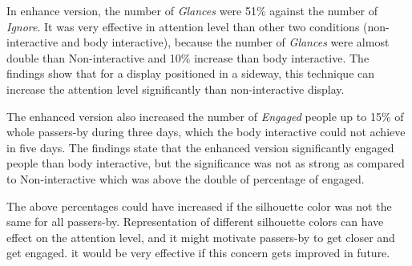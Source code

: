 In enhance version, the number of \emph{Glances} were 51\% against the number of \emph{Ignore}. It was very effective in attention level than other two conditions (non-interactive and body interactive), because the number of \emph{Glances} were almost double than Non-interactive and 10\% increase than body interactive. The findings show that for a display positioned in a sideway, this technique can increase the attention level significantly than non-interactive display.

The enhanced version also increased the number of \emph{Engaged} people up to 15\% of whole passers-by during three days, which the body interactive could not achieve in five days. The findings state that the enhanced version significantly engaged people than body interactive, but the significance was not as strong as compared to Non-interactive which was above the double of percentage of engaged. 

The above percentages could have increased if the silhouette color was not the same for all passers-by. Representation of different silhouette colors can have effect on the attention level, and it might motivate passers-by to get closer and get engaged. it would be very effective if this concern gets improved in future.






